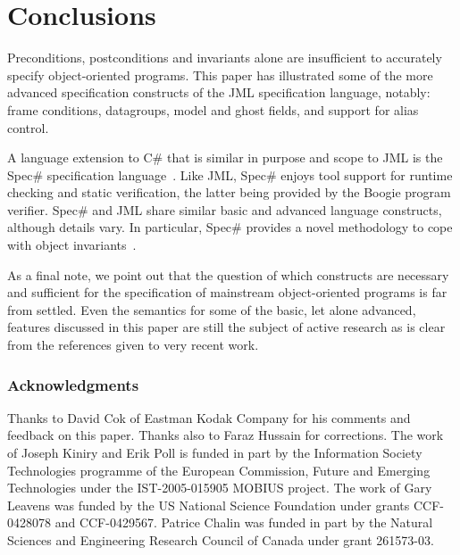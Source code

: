 \documentclass{llncs}
\begin{document}


\section{Conclusions}
\label{Sec:conclusion}

Preconditions, postconditions and invariants alone are insufficient to
accurately specify object-oriented programs.  This paper has illustrated some of
the more advanced specification constructs of the JML specification language,
notably: frame conditions, datagroups, model and
ghost fields, and support for alias control.

A language extension to C\# that is similar in purpose and scope to JML is
the Spec\# specification language~\cite{SpecSharp}.
%
Like JML, Spec\# enjoys tool support for runtime checking and static
verification, the latter being provided by the Boogie program verifier.
%
Spec\# and JML share similar basic and advanced language constructs, 
although details vary.  In particular, Spec\# provides a novel methodology to 
cope with object invariants~\cite{BoogieInvariants}.

As a final note, we point out that the question of which constructs are necessary and
sufficient for the specification of mainstream object-oriented
programs is far from settled.  Even the semantics for
some of the basic, let alone advanced, features discussed in this
paper are still the subject of active research as is clear from the
references given to very recent work.

\subsubsection*{Acknowledgments}

Thanks to David Cok of Eastman Kodak Company for his comments and feedback
on this paper.  Thanks also to Faraz Hussain for corrections.
The work of Joseph Kiniry and Erik Poll is funded in part by the Information 
Society Technologies programme of the European Commission, Future and 
Emerging Technologies under the IST-2005-015905 MOBIUS project.
The work of Gary Leavens was funded by the US National Science
Foundation under grants CCF-0428078 and CCF-0429567.
Patrice Chalin was funded in part by the Natural Sciences and Engineering Research Council of Canada under grant 261573-03.



\end{document}
